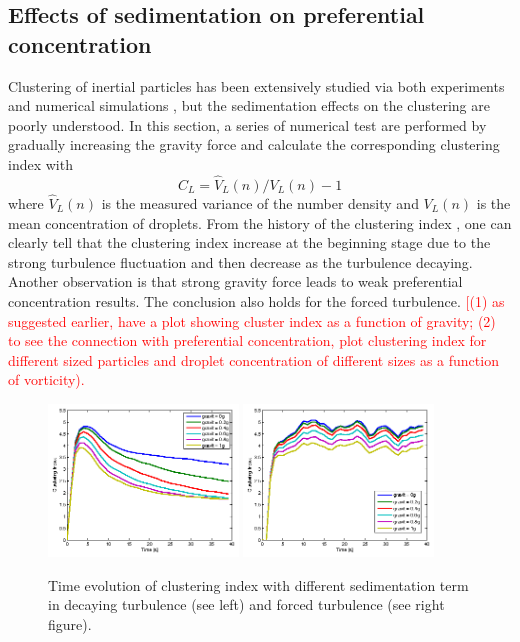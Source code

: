 \documentclass[draft,jgrga]{AGUTeX}
\begin{document}
\begin{article}
\section{Effects of sedimentation on preferential concentration }
Clustering of inertial particles has been extensively studied via both 
experiments and numerical simulations \cite{Sundaram97, Reade2000}, but the sedimentation effects on the clustering are poorly understood. In this section, a series of numerical test are performed by gradually increasing the gravity force and calculate the corresponding clustering index \cite{Vaillancourt02} with
\begin{equation}
C_L = \hat{V}_L(n)/V_L(n)-1
\label{eq:cluster_index}
\end{equation}
where $\hat{V}_L(n)$ is the measured variance of the number density and $V_L(n)$ is the mean concentration of droplets.
From the history of the clustering index , one can clearly tell that the clustering index increase at the beginning stage due to the strong turbulence fluctuation and then decrease as the turbulence decaying. Another observation is that strong gravity force leads to weak preferential concentration results. The conclusion also holds for the forced turbulence. 
\textcolor{red}{
[(1) as suggested earlier, have a plot showing cluster index as a function of gravity; (2) to see the connection with preferential concentration, plot clustering index for different sized particles and droplet concentration of different sizes as a function of vorticity).
}
\begin{figure}[H]\centering
\includegraphics[width=0.45\textwidth]{Figures/gravity_time_decay}
\includegraphics[width=0.45\textwidth]{Figures/gravity_time_force}
\caption{Time evolution of clustering index with different sedimentation term in decaying turbulence (see left) and 
forced turbulence (see right figure).}
\label{fig:gravity_cluster}
\end{figure}




\end{article}
\end{document}
